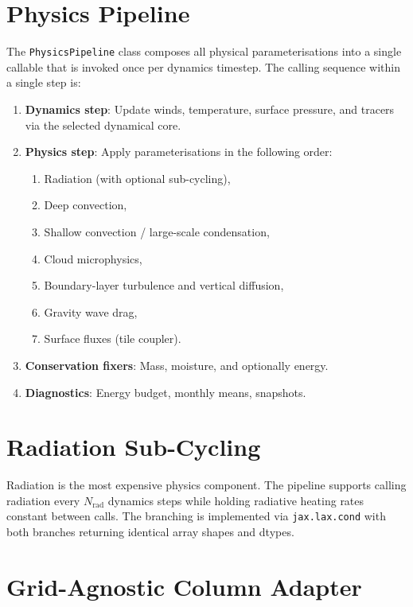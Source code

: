 \documentclass[11pt,twoside]{report}
\begin{document}
\section{Physics Pipeline}

The \texttt{PhysicsPipeline} class composes all physical parameterisations
into a single callable that is invoked once per dynamics timestep.  The
calling sequence within a single step is:

\begin{enumerate}[nosep]
  \item \textbf{Dynamics step}: Update winds, temperature, surface pressure,
    and tracers via the selected dynamical core.
  \item \textbf{Physics step}: Apply parameterisations in the following order:
    \begin{enumerate}[nosep]
      \item Radiation (with optional sub-cycling),
      \item Deep convection,
      \item Shallow convection / large-scale condensation,
      \item Cloud microphysics,
      \item Boundary-layer turbulence and vertical diffusion,
      \item Gravity wave drag,
      \item Surface fluxes (tile coupler).
    \end{enumerate}
  \item \textbf{Conservation fixers}: Mass, moisture, and optionally energy.
  \item \textbf{Diagnostics}: Energy budget, monthly means, snapshots.
\end{enumerate}

\section{Radiation Sub-Cycling}

Radiation is the most expensive physics component.  The pipeline supports
calling radiation every $N_{\mathrm{rad}}$ dynamics steps while holding
radiative heating rates constant between calls.  The branching is implemented
via \texttt{jax.lax.cond} with both branches returning identical array
shapes and dtypes.

\section{Grid-Agnostic Column Adapter}
\end{document}

